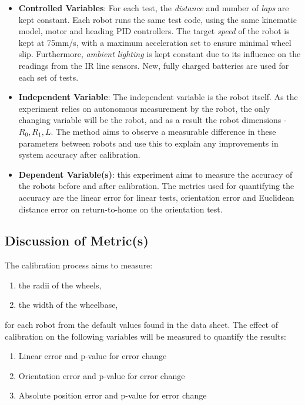 \documentclass[conference]{IEEEtran}
\begin{document}
\begin{itemize}
    \item \textbf{Controlled Variables}: 
    For each test, the \emph{distance} and number of \emph{laps} are kept constant. 
    Each robot runs the same test code, using the same kinematic model, motor and heading PID controllers. 
    The target \emph{speed} of the robot is kept at 75mm/s, with a maximum acceleration set to ensure minimal wheel slip.
    Furthermore, \emph{ambient lighting} is kept constant due to its influence on the readings from the IR line sensors. 
    New, fully charged batteries are used for each set of tests.
    \item \textbf{Independent Variable}: 
    The independent variable is the robot itself. 
    As the experiment relies on autonomous measurement by the robot, the only changing variable will be the robot, and as a result the robot dimensions - $R_0, R_1, L$. 
    The method aims to observe a measurable difference in these parameters between robots and use this to explain any improvements in system accuracy after calibration. 
    \item \textbf{Dependent Variable(s)}: this experiment aims to measure the accuracy of the robots before and after calibration. The metrics used for quantifying the accuracy are the linear error for linear tests, orientation error and Euclidean distance error on return-to-home on the orientation test.
\end{itemize}

\subsection{Discussion of Metric(s)}

The calibration process aims to measure:
\begin{enumerate}
    \item the radii of the wheels,
    \item the width of the wheelbase,
\end{enumerate}
for each robot from the default values found in the data sheet.
The effect of calibration on the following variables will be measured to quantify the results:
\begin{enumerate}
    \item Linear error and p-value for error change
    \item Orientation error and p-value for error change
    \item Absolute position error and p-value for error change
\end{enumerate}
\end{document}
